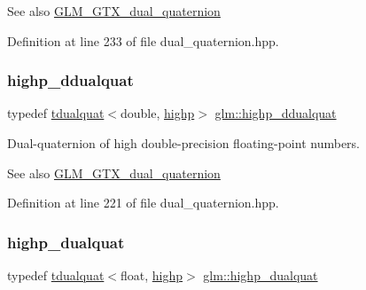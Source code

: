 \begin{DoxySeeAlso}{See also}
\mbox{\hyperlink{group__gtx__dual__quaternion}{G\+L\+M\+\_\+\+G\+T\+X\+\_\+dual\+\_\+quaternion}} 
\end{DoxySeeAlso}


Definition at line 233 of file dual\+\_\+quaternion.\+hpp.

\mbox{\label{group__gtx__dual__quaternion_ga83e4c5d27c8b0a264a3f3aed24f3f84e}} 
\subsubsection{\texorpdfstring{highp\_ddualquat}{highp\_ddualquat}}
{\footnotesize\ttfamily typedef \mbox{\hyperlink{structglm_1_1tdualquat}{tdualquat}}$<$double, \mbox{\hyperlink{namespaceglm_a0f04f086094c747d227af4425893f545ac6f7eab42eacbb10d59a58e95e362074}{highp}}$>$ \mbox{\hyperlink{group__gtx__dual__quaternion_ga83e4c5d27c8b0a264a3f3aed24f3f84e}{glm\+::highp\+\_\+ddualquat}}}

Dual-\/quaternion of high double-\/precision floating-\/point numbers.

\begin{DoxySeeAlso}{See also}
\mbox{\hyperlink{group__gtx__dual__quaternion}{G\+L\+M\+\_\+\+G\+T\+X\+\_\+dual\+\_\+quaternion}} 
\end{DoxySeeAlso}


Definition at line 221 of file dual\+\_\+quaternion.\+hpp.

\mbox{\label{group__gtx__dual__quaternion_ga98557c3577757f2ced8f35b1de7fa234}} 
\subsubsection{\texorpdfstring{highp\_dualquat}{highp\_dualquat}}
{\footnotesize\ttfamily typedef \mbox{\hyperlink{structglm_1_1tdualquat}{tdualquat}}$<$float, \mbox{\hyperlink{namespaceglm_a0f04f086094c747d227af4425893f545ac6f7eab42eacbb10d59a58e95e362074}{highp}}$>$ \mbox{\hyperlink{group__gtx__dual__quaternion_ga98557c3577757f2ced8f35b1de7fa234}{glm\+::highp\+\_\+dualquat}}}

